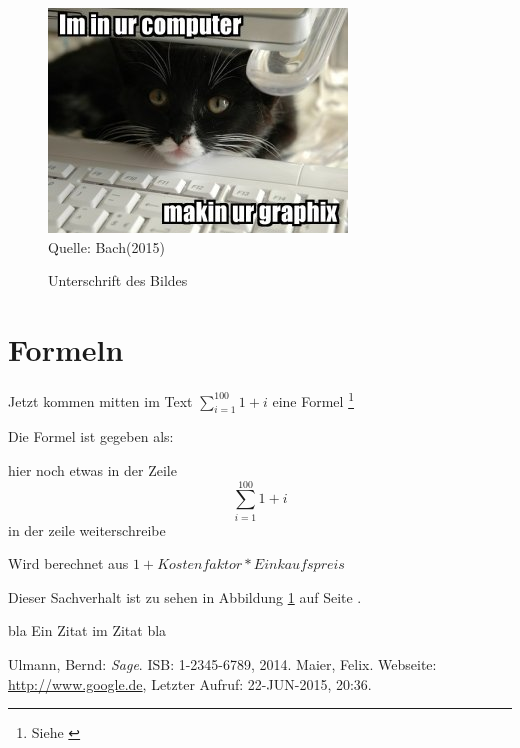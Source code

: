 \documentclass{article}
\begin{document}
	\begin{figure}
		\includegraphics[height=0.35\textheight]{Images/lolcat-sample.jpg} \\
		Quelle: Bach(2015)
		\caption{Unterschrift des Bildes}
		\label{fig:bild1}
	\end{figure}



\section{Formeln}

 Jetzt kommen mitten im Text $ \sum_{i=1}^{100} 1+i $ eine Formel %
 \footnote{Siehe \cite[S. 307]{ulmann-2015} } %

 Die Formel ist gegeben als:

 hier noch etwas in der Zeile
 \begin{displaymath} %
 \sum_{i=1}^{100} 1+i 
 \end{displaymath} in der zeile weiterschreibe

 	Wird berechnet aus $1+Kostenfaktor*Einkaufspreis$

\newpage


Dieser Sachverhalt ist zu sehen in Abbildung \ref{fig:bild1} auf Seite \pageref{fig:bild1}. %


\glqq{}bla \glq{}Ein Zitat im Zitat\grq{} bla\grqq{} %

\setcounter{page}{2} %

\listoffigures

\listoftables

\begin{thebibliography}{Ulmann(2015)}
		Ulmann, Bernd: \textit{Sage}.
			ISB: 1-2345-6789, 2014.
		Maier, Felix.
		Webseite: \url{http://www.google.de}, Letzter Aufruf: 22-JUN-2015, 20:36.
\end{thebibliography}

\end{document}
